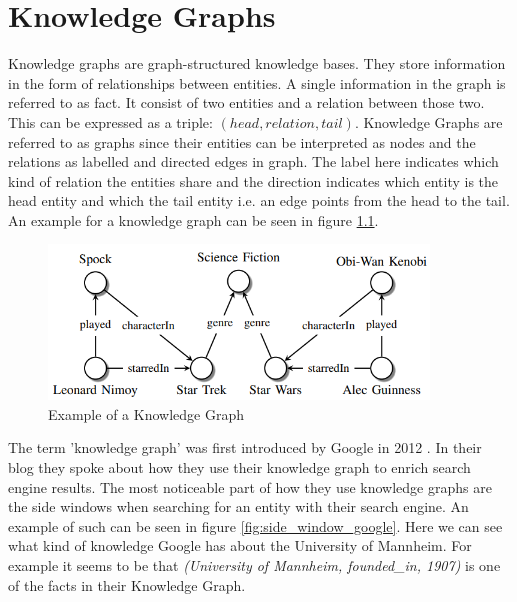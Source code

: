 \chapter{Knowledge Graphs}
\label{cha:knowledge_graphs}

Knowledge graphs are graph-structured knowledge bases. They store information in the form of relationships between entities. A single information in the graph is referred to as fact. It consist of two entities and a relation between those two. This can be expressed as a triple: $(head, relation, tail)$. Knowledge Graphs are referred to as graphs since their entities can be interpreted as nodes and the relations as labelled and directed edges in graph. The label here indicates which kind of relation the entities share and the direction indicates which entity is the head entity and which the tail entity i.e. an edge points from the head to the tail. An example for a knowledge graph can be seen in figure \ref{fig:example_kg}. \cite{nickel_review_2016}

\begin{figure}[H]
\centering
\includegraphics[width=0.9\textwidth]{images/example_kg.png}
\caption{Example of a Knowledge Graph}
\label{fig:example_kg}
\end{figure}

The term 'knowledge graph' was first introduced by Google in 2012 \cite{singhal_introducing_2012}. In their blog they spoke about how they use their knowledge graph to enrich search engine results. The most noticeable part of how they use knowledge graphs are the side windows when searching for an entity with their search engine. An example of such can be seen in figure \ref{fig:side_window_google}. Here we can see what kind of knowledge Google has about the University of Mannheim. For example it seems to be that \textit{(University of Mannheim, founded\_in, 1907)} is one of the facts in their Knowledge Graph.

